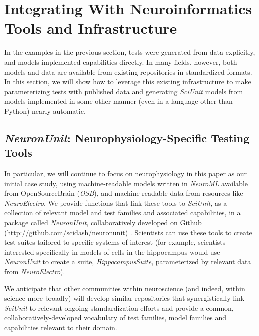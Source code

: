 \documentclass{frontiersSCNS}
\begin{document}
\section{Integrating With Neuroinformatics Tools and Infrastructure}\label{sec:neuronunit}
In the examples in the previous section, tests were generated from data explicitly, and models implemented capabilities directly. In many fields, however, both models and data are available from existing  repositories in standardized formats. In this section, we will show how to leverage this existing infrastructure to make parameterizing tests with published data and generating \textit{SciUnit} models from models implemented in some other manner (even in a language other than Python) nearly automatic.

\subsection{\textit{NeuronUnit}: Neurophysiology-Specific Testing Tools}\label{sec:neuronunit_acitivities}
In particular, we will continue to focus on neurophysiology in this paper as our initial case study, using machine-readable models written in \textit{NeuroML} available from OpenSourceBrain (\textit{OSB}), and machine-readable data from resources like \textit{NeuroElectro}. We provide functions that  link these tools to \textit{SciUnit}, as a collection of relevant model and test families and associated capabilities, in a package called \textit{NeuronUnit}, collaboratively developed on Github (\url{http://github.com/scidash/neuronunit}) .  Scientists can use these tools to create test suites tailored to specific systems of interest (for example, scientists interested specifically in models of cells in the hippocampus would use \textit{NeuronUnit} to create a suite, \textit{HippocampusSuite}, parameterized by relevant data from \textit{NeuroElectro}).

We anticipate that other communities within neuroscience (and indeed, within science more broadly) will develop similar repositories that synergistically link \textit{SciUnit} to relevant ongoing standardization efforts and provide a common, collaboratively-developed vocabulary of test families, model families and capabilities relevant to their domain.
\end{document}
